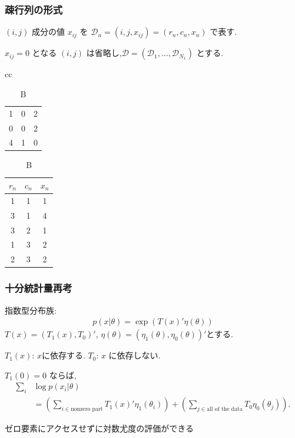 \documentclass[dvipdfmx, dvipsnames]{beamer}
\begin{document}
 \begin{frame} 
 \frametitle{疎行列の形式}
$(i,j)$ 成分の値 $x_{ij}$ を $ \mathcal{D}_n  = (i,j,x_{ij})=(r_n, c_n, x_n)$ で表す. 

$x_{ij}=0$ となる $(i,j)$ は省略し,$\mathcal{D}=(\mathcal{D}_1, \ldots, \mathcal{D}_{N_1})$ とする. 
\begin{table}[tbp]
\centering
\caption{AとBは同じ情報を持つ}
\begin{tabular}{cc}
\begin{minipage}{0.3\linewidth}
\centering
{
\caption{A}
\begin{tabular}{|ccc|}
\hline
1 & 0 & 2\\
0 & 0 & 2\\
4 & 1 & 0\\
\hline
\end{tabular}
}
\end{minipage}
\begin{minipage}{0.3\linewidth}
\centering
{
\caption{B}
\begin{tabular}{ccc}
\hline
$r_n$ & $c_n$ & $x_n$\\
\hline
1 & 1 & 1\\
3 & 1 & 4\\
3 & 2 & 1\\
1 & 3 & 2\\
2 & 3 & 2\\
\hline
\end{tabular}
}
\end{minipage}
\end{tabular}
\end{table}
 \end{frame}
 
\begin{frame} 
\frametitle{十分統計量再考}

指数型分布族:
\begin{align*}
p(x|\theta) = \exp( T(x)' \eta(\theta))
\end{align*}
$T(x) = (T_1(x), T_0)'$, $\eta(\theta) = (\eta_1(\theta), \eta_0(\theta))'$とする.

 $T_1(x)$: $x$に依存する. $T_0$: $x$ に依存しない. 

$T_1(0)=0$ ならば,
\begin{align*}
\sum_i &\log p(x_i|\theta) \\
&= \left(\sum_{i \in \mbox{nonzero part}}T_1(x)'  \eta_1(\theta_i)\right) + \left(\sum_{j \in \mbox{all of the data}}{T_0 \eta_0(\theta_j)}\right).
\end{align*}

ゼロ要素にアクセスせずに対数尤度の評価ができる
\end{frame}
\end{document}
